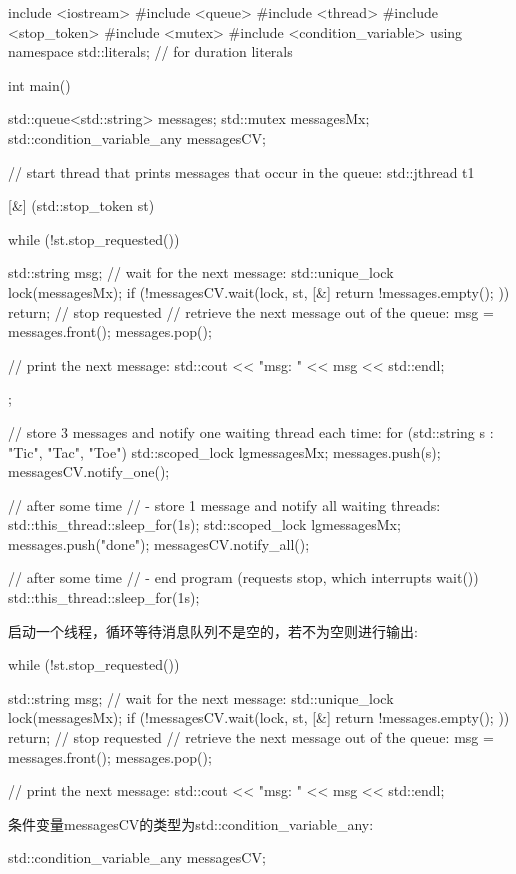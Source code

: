 \begin{cpp}
include <iostream>
#include <queue>
#include <thread>
#include <stop_token>
#include <mutex>
#include <condition_variable>
using namespace std::literals; // for duration literals

int main()
{
	std::queue<std::string> messages;
	std::mutex messagesMx;
	std::condition_variable_any messagesCV;

	// start thread that prints messages that occur in the queue:
	std::jthread t1{[&] (std::stop_token st) {
			while (!st.stop_requested()) {
				std::string msg;
				{
					// wait for the next message:
					std::unique_lock lock(messagesMx);
					if (!messagesCV.wait(lock, st,
										[&] {
											return !messages.empty();
										})) {
						return; // stop requested
					}
					// retrieve the next message out of the queue:
					msg = messages.front();
					messages.pop();
				}

				// print the next message:
				std::cout << "msg: " << msg << std::endl;
			}
	}};

	// store 3 messages and notify one waiting thread each time:
	for (std::string s : {"Tic", "Tac", "Toe"}) {
		std::scoped_lock lg{messagesMx};
		messages.push(s);
		messagesCV.notify_one();
	}

	// after some time
	// - store 1 message and notify all waiting threads:
	std::this_thread::sleep_for(1s);
	{
		std::scoped_lock lg{messagesMx};
		messages.push("done");
		messagesCV.notify_all();
	}

	// after some time
	// - end program (requests stop, which interrupts wait())
	std::this_thread::sleep_for(1s);
}
\end{cpp}

启动一个线程，循环等待消息队列不是空的，若不为空则进行输出:

\begin{cpp}
while (!st.stop_requested()) {
	std::string msg;
	{
		// wait for the next message:
		std::unique_lock lock(messagesMx);
		if (!messagesCV.wait(lock, st,
							[&] {
								return !messages.empty();
							})) {
			return; // stop requested
		}
		// retrieve the next message out of the queue:
		msg = messages.front();
		messages.pop();
	}

	// print the next message:
	std::cout << "msg: " << msg << std::endl;
}
\end{cpp}

条件变量messagesCV的类型为std::condition\_variable\_any:

\begin{cpp}
std::condition_variable_any messagesCV;
\end{cpp}

